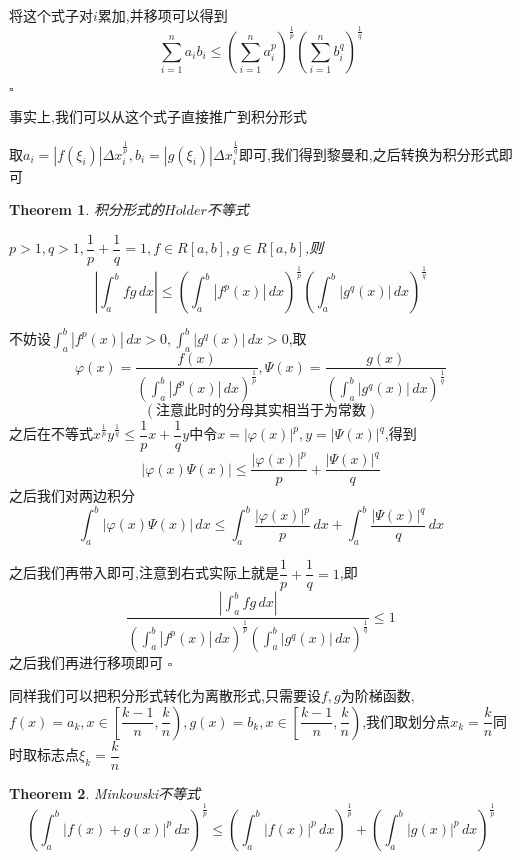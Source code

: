 \documentclass[11pt,hyperref,a4paper,UTF8]{ctexart}
\newtheorem{theorem}{Theorem}[subsection]
\newenvironment{cproof}{%
\heiti{证明}\kaishu
}{%
  \hfill $\square$
  \par\bigskip
}
\newcommand{\parameter}[1]{\left(#1\right)}
\newcommand{\abs}[1]{\left|#1\right|}
\begin{document}
\begin{CJK}{UTF8}{gkai}
\begin{cproof}
将这个式子对$i$累加,并移项可以得到
\[\sum_{i = 1}^n a_i b_i \leq \parameter{\sum_{i = 1}^n a_i^p}^{\frac{1}{p}} \parameter{\sum_{i = 1}^n b_i^q}^{\frac{1}{q}}\]

\end{cproof}

事实上,我们可以从这个式子直接推广到积分形式

取$a_i = |f(\xi_i)|\Delta x_i^{\frac{1}{p}} , b_i = |g(\xi_i)|\Delta x_i ^\frac{1}{q}$即可,我们得到黎曼和,之后转换为积分形式即可\\

\begin{theorem}

积分形式的$H\ddot{o}lder$不等式

$p > 1,q > 1 , \dfrac{1}{p } + \dfrac{1}{q} = 1,f \in R[a,b],g\in R[a,b]$,则
\[\abs{\int_{a}^{b}fg\, dx} \leq \parameter{\int_{a}^{b}|f^p(x)|\,dx}^{\frac{1}{p}} \parameter{\int_{a}^{b}|g^q(x)|\,dx}^{\frac{1}{q}}\]
\end{theorem}

\begin{cproof}
不妨设$\int_{a}^{b}|f^p(x)|\,dx > 0, \int_{a}^{b}|g^q(x)|\,dx > 0$,取
\[\varphi(x) = \dfrac{f(x)}{\parameter{\int_{a}^{b}|f^p(x)|\,dx}^{\frac{1}{p}}},\varPsi(x) = \dfrac{g(x)}{\parameter{\int_{a}^{b}|g^q(x)|\,dx}^{\frac{1}{q}}}\]
\[(\text{注意此时的分母其实相当于为常数})\]
之后在不等式$x^{\frac{1}{p}} y^{\frac{1}{q}} \leq \dfrac{1}{p}x + \dfrac{1}{q} y$中令$x = |\varphi(x)|^p, y = |\varPsi(x)|^q$,得到
\[|\varphi(x)\varPsi(x)| \leq \dfrac{|\varphi(x)|^p}{p} + \dfrac{|\varPsi(x)|^q}{q}\]
之后我们对两边积分
\[\int_{a}^{b}|\varphi(x)\varPsi(x)|\, dx \leq \int_{a}^{b}\dfrac{|\varphi(x)|^p}{p}\,dx +\int_{a}^{b} \dfrac{|\varPsi(x)|^q}{q}\, dx\]

之后我们再带入即可,注意到右式实际上就是$\dfrac{1}{p } + \dfrac{1}{q} = 1$,即\\
\[ \dfrac{\abs{\int_{a}^{b}fg\, dx}}{\parameter{\int_{a}^{b}|f^p(x)|\,dx}^{\frac{1}{p}}\parameter{\int_{a}^{b}|g^q(x)|\,dx}^{\frac{1}{q}}}\leq 1\]
之后我们再进行移项即可
\end{cproof}

同样我们可以把积分形式转化为离散形式,只需要设$f,g$为阶梯函数,$f(x) = a_k , x\in \left[\dfrac{k - 1}{n}, \dfrac{k}{n}\right),g(x) = b_k , x\in \left[\dfrac{k - 1}{n}, \dfrac{k}{n}\right)$,我们取划分点$x_k = \dfrac{k}{n}$同时取标志点$\xi_k = \dfrac{k}{n}$\\

\begin{theorem}
  Minkowski不等式
  \[\parameter{\int_{a}^{b} \abs{f(x) + g(x)}^p\, dx}^{\frac{1}{p}}  \leq \parameter{\int_{a}^{b}|f(x)|^p\,dx}^{\frac{1}{p}}+\parameter{\int_{a}^{b}|g(x)|^p\,dx}^{\frac{1}{p}}\]
\end{theorem}


\end{CJK}
\end{document}
